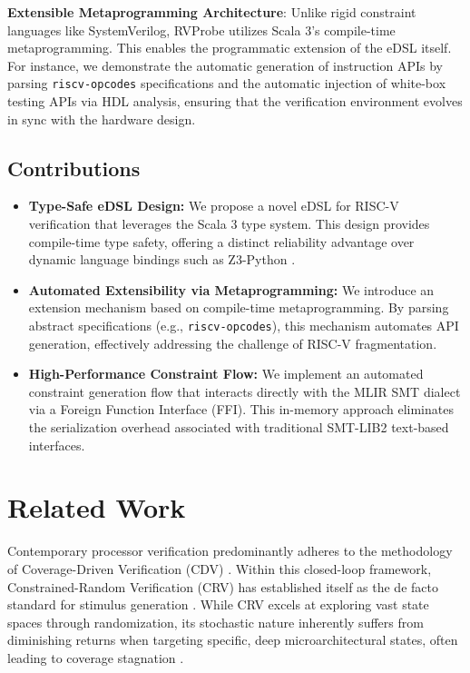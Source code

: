 \documentclass[sigconf]{acmart}
\begin{document}
\textbf{Extensible Metaprogramming Architecture}: Unlike rigid constraint languages like SystemVerilog, RVProbe utilizes Scala 3's compile-time metaprogramming. This enables the programmatic extension of the eDSL itself. For instance, we demonstrate the automatic generation of instruction APIs by parsing \texttt{riscv-opcodes} specifications and the automatic injection of white-box testing APIs via HDL analysis, ensuring that the verification environment evolves in sync with the hardware design.

\subsection{Contributions}
\begin{itemize}
    \item \textbf{Type-Safe eDSL Design:} We propose a novel eDSL for RISC-V verification that leverages the Scala 3 type system. This design provides compile-time type safety, offering a distinct reliability advantage over dynamic language bindings such as Z3-Python \cite{26}.
    \item \textbf{Automated Extensibility via Metaprogramming:} We introduce an extension mechanism based on compile-time metaprogramming. By parsing abstract specifications (e.g., \texttt{riscv-opcodes}), this mechanism automates API generation, effectively addressing the challenge of RISC-V fragmentation.
    \item \textbf{High-Performance Constraint Flow:} We implement an automated constraint generation flow that interacts directly with the MLIR SMT dialect via a Foreign Function Interface (FFI). This in-memory approach eliminates the serialization overhead associated with traditional SMT-LIB2 text-based interfaces.
\end{itemize}

\section{Related Work}\label{Sec2}

Contemporary processor verification predominantly adheres to the methodology of Coverage-Driven Verification (CDV) \cite{6}. Within this closed-loop framework, Constrained-Random Verification (CRV) has established itself as the de facto standard for stimulus generation \cite{19}. While CRV excels at exploring vast state spaces through randomization, its stochastic nature inherently suffers from diminishing returns when targeting specific, deep microarchitectural states, often leading to coverage stagnation \cite{7}.
\end{document}
